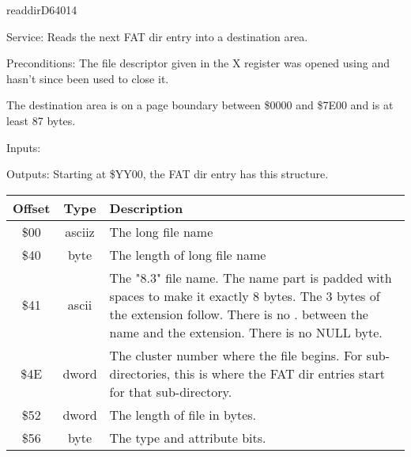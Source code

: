 \newpage
\begin{hyppotrap}{readdir}{D640}{14}
\item [Service:]
  Reads the next FAT dir entry into a destination area.
\item [Preconditions:]
  The file descriptor given in the X register was opened using
   and  hasn't since been used to close it.

  The destination area is on a page boundary between \$0000 and \$7E00 and is
  at least 87 bytes.
\item [Inputs:]
\item [Outputs:]
  Starting at \$YY00, the FAT dir entry has this structure.
  {\setlength{\tabcolsep}{2mm}
  \begin{tabular}{|c|c|p{6.9cm}|}
  \hline
  \textbf{Offset} & \textbf{Type} & \textbf{Description}
  \\\hline
  \$00 & asciiz & The long file name
  \\
  \$40 & byte & The length of long file name
  \\
  \$41 & ascii & The "8.3" file name. The name part is padded with spaces to make
               it exactly 8 bytes. The 3 bytes of the extension follow. There is
               no . between the name and the extension. There is no NULL byte.
  \\
  \$4E & dword & The cluster number where the file begins. For sub-directories,
               this is where the FAT dir entries start for that sub-directory.
  \\
  \$52 & dword & The length of file in bytes.
  \\
  \$56 & byte  & The type and attribute bits.
  \\\hline
  \end{tabular}
  }


\end{hyppotrap}
